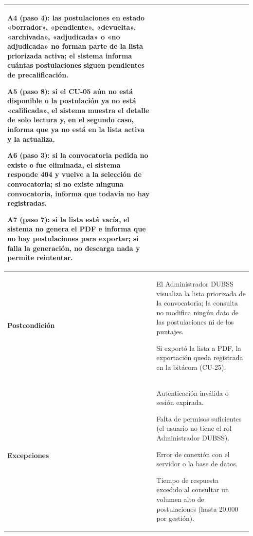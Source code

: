 \begin{longtable}{>{\raggedright\arraybackslash}p{2.9cm} >{\raggedright\arraybackslash}p{12.6cm}}
\begin{cuvin}
    \item A4 (paso 4): las postulaciones en estado «borrador», «pendiente», «devuelta», «archivada», «adjudicada» o «no adjudicada» no forman parte de la lista priorizada activa; el sistema informa cuántas postulaciones siguen pendientes de precalificación.
    \item A5 (paso 8): si el CU-05 aún no está disponible o la postulación ya no está «calificada», el sistema muestra el detalle de solo lectura y, en el segundo caso, informa que ya no está en la lista activa y la actualiza.
    \item A6 (paso 3): si la convocatoria pedida no existe o fue eliminada, el sistema responde 404 y vuelve a la selección de convocatoria; si no existe ninguna convocatoria, informa que todavía no hay registradas.
    \item A7 (paso 7): si la lista está vacía, el sistema no genera el PDF e informa que no hay postulaciones para exportar; si falla la generación, no descarga nada y permite reintentar.
\end{cuvin} \\
\midrule
\textbf{Postcondición} & \vspace{-\baselineskip}\begin{cuvin}
    \item El Administrador DUBSS visualiza la lista priorizada de la convocatoria; la consulta no modifica ningún dato de las postulaciones ni de los puntajes.
    \item Si exportó la lista a PDF, la exportación queda registrada en la bitácora (CU-25).
\end{cuvin} \\
\midrule
\textbf{Excepciones} & \vspace{-\baselineskip}\begin{cuvin}
    \item Autenticación inválida o sesión expirada.
    \item Falta de permisos suficientes (el usuario no tiene el rol Administrador DUBSS).
    \item Error de conexión con el servidor o la base de datos.
    \item Tiempo de respuesta excedido al consultar un volumen alto de postulaciones (hasta 20,000 por gestión).
\end{cuvin} \\
\end{longtable}
\endgroup
\addtocounter{table}{-1}

\label{sec:cap5_cu07}

